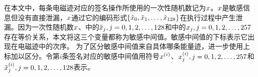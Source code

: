 {%
%				
%				
%				
%				
%				
%				
%				
	在本文中，每条电磁迹对应的签名操作所使用的一次性随机数记为$x$。$x$是敏感信息但没有直接泄漏，$x$通过它的编码形式$\left\{\tilde{x}_0,\tilde{x}_1,\dots,\tilde{x}_{128}\right\}$在执行过程中产生泄漏。因为一次性随机数$x$、中的$\tilde{x}_j,j=0,1,2,\dots,128$和中的$x_j,j=0,1,2,\dots,257$存在等价关系，本文将这三个变量都称为敏感中间值。敏感中间值的下标表示它出现在电磁迹中的次序。
	为了区分敏感中间值来自具体哪条能量迹，进一步使用上标加以区分。令第$i$条签名对应的敏感中间值用符号$x^{(i)}$、$x^{(i)}_j,j=0,1,2,\dots,257$和$\tilde{x}^{(i)}_j,j=0,1,2,\dots,128$表示。
	
}
